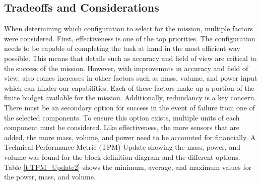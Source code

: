 \documentclass[conf]{new-aiaa}
\begin{document}



\subsection{Tradeoffs and Considerations}
When determining which configuration to select for the mission, multiple factors were considered. First, effectiveness is one of the top priorities. The configuration needs to be capable of completing the task at hand in the most efficient way possible. This means that details such as accuracy and field of view are critical to the success of the mission. However, with improvemnts in  accuracy and field of view, also comes increases in other factors such as mass, volume, and power input which can hinder our capabilities. Each of these factors make up a portion of the finite  budget available for the mission. Additionally, redundancy is a key concern. There must be an secondary option  for success in the event of failure from one of the selected components. To ensure this option exists, multiple units of each component must be considered. Like effectiveness, the more sensors that are added, the more mass, volume, and power need to be accounted for financially. A Technical Performance Metric (TPM) Update showing the mass, power, and volume was found for the block definition diagram and the different options. Table \ref{t:TPM_Update2} shows the minimum, average, and maximum values for the power, mass, and volume.
\end{document}
